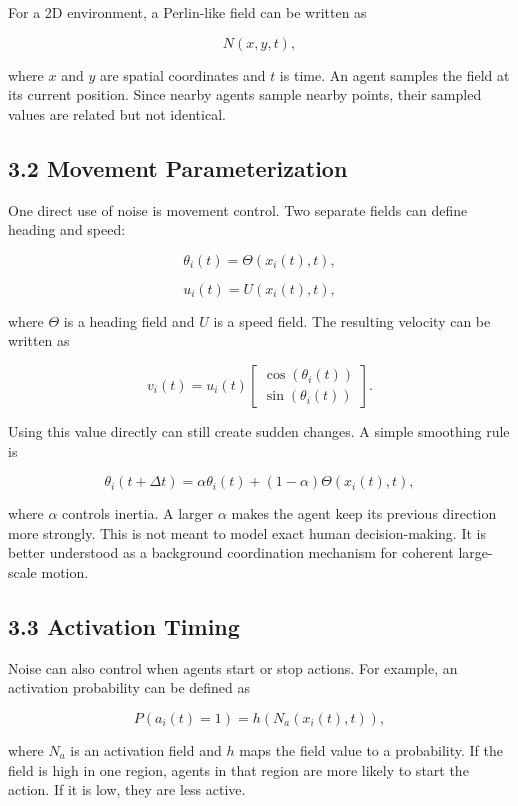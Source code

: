 \documentclass[
  11pt,
]{article}
\begin{document}
For a 2D environment, a Perlin-like field can be written as

\[
N(x,y,t),
\]

where \(x\) and \(y\) are spatial coordinates and \(t\) is time. An
agent samples the field at its current position. Since nearby agents
sample nearby points, their sampled values are related but not
identical.

\subsection{3.2 Movement
Parameterization}\label{movement-parameterization}

One direct use of noise is movement control. Two separate fields can
define heading and speed:

\[
\theta_i(t) = \Theta(x_i(t),t),
\]

\[
u_i(t) = U(x_i(t),t),
\]

where \(\Theta\) is a heading field and \(U\) is a speed field. The
resulting velocity can be written as

\[
v_i(t) =
u_i(t)
\begin{bmatrix}
\cos(\theta_i(t)) \\
\sin(\theta_i(t))
\end{bmatrix}.
\]

Using this value directly can still create sudden changes. A simple
smoothing rule is

\[
\theta_i(t+\Delta t)
=
\alpha \theta_i(t)
+
(1-\alpha)\Theta(x_i(t),t),
\]

where \(\alpha\) controls inertia. A larger \(\alpha\) makes the agent
keep its previous direction more strongly. This is not meant to model
exact human decision-making. It is better understood as a background
coordination mechanism for coherent large-scale motion.

\subsection{3.3 Activation Timing}\label{activation-timing}

Noise can also control when agents start or stop actions. For example,
an activation probability can be defined as

\[
P(a_i(t)=1) = h(N_a(x_i(t),t)),
\]

where \(N_a\) is an activation field and \(h\) maps the field value to a
probability. If the field is high in one region, agents in that region
are more likely to start the action. If it is low, they are less active.
\end{document}
